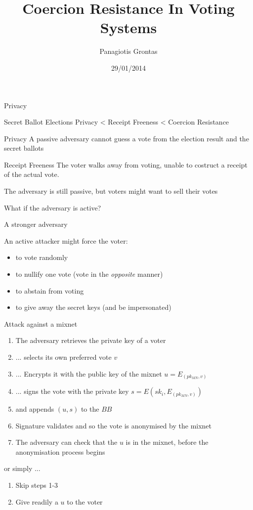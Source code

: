 \documentclass{beamer}
\title{Coercion Resistance In Voting Systems}
\author{Panagiotis Grontas}
\date{29/01/2014}
\institute{$\mu\Pi\lambda\forall$  - CoReLab Crypto Group}
\begin{document}
\begin{frame}
\titlepage
\end{frame}
 

\begin{frame}[allowframebreaks]{Privacy}

\begin{block}{Secret Ballot Elections}
Privacy < Receipt Freeness < Coercion Resistance
\end{block}

\begin{block}{Privacy}
A passive adversary cannot guess a vote from the election result and the secret ballots
\end{block}

\begin{block}{Receipt Freeness}
The voter walks away from voting, unable to costruct a receipt of the actual vote. 
\end{block}

The adversary is still passive, but voters might want to sell their votes

What if the adversary is active?
\end{frame}

\begin{frame}[allowframebreaks]{A stronger adversary}

An active attacker might force the voter:

\begin{itemize} 
\item to vote randomly
\item to nullify one vote (vote in the \textit{opposite} manner)
\item to abstain from voting
\item to give away the secret keys (and be impersonated)
\end{itemize}


\begin{block}{Attack against a mixnet}
\begin{enumerate} 
\item The adversary retrieves the private key of a voter
\item ... selects its own preferred vote $v$
\item ... Encrypts it with the public key of the mixnet $u = E_(pk_{MN}, v)$
\item ... signs the vote with the private key $s = E(sk_{i}, E_(pk_{MN}, v))$
\item and appends $(u,s)$ to the $BB$
\item Signature validates and so the vote is anonymised by the mixnet
\item The adversary can check that the $u$ is in the mixnet, before the anonymisation process begins
\end{enumerate}
or simply ...
\begin{enumerate}
\item Skip steps 1-3 
\item Give readily a $u$ to the voter
\end{enumerate}
\end{block}

 
\end{frame}
\end{document}
